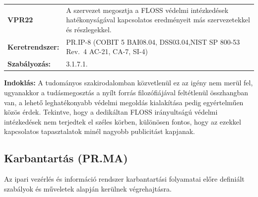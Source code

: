 \documentclass[12pt,magyar,a4paper,oneside]{scrreprt}
\begin{document}
\begin{longtable}[]{@{}ll@{}}
\toprule
\endhead
\begin{minipage}[t]{0.16\columnwidth}\raggedright
\textbf{VPR22}\strut
\end{minipage} & \begin{minipage}[t]{0.79\columnwidth}\raggedright
A szervezet megosztja a FLOSS védelmi intézkedések hatékonyságával
kapcsolatos eredményeit más szervezetekkel és részlegekkel.\strut
\end{minipage}\tabularnewline
\begin{minipage}[t]{0.16\columnwidth}\raggedright
\textbf{Keretrendszer:}\strut
\end{minipage} & \begin{minipage}[t]{0.79\columnwidth}\raggedright
PR.IP-8 (COBIT 5 BAI08.04, DSS03.04,NIST SP 800-53 Rev.~4 AC-21, CA-7,
SI-4)\strut
\end{minipage}\tabularnewline
\begin{minipage}[t]{0.16\columnwidth}\raggedright
\textbf{Szabályozás:}\strut
\end{minipage} & \begin{minipage}[t]{0.79\columnwidth}\raggedright
3.1.7.1.\strut
\end{minipage}\tabularnewline
\bottomrule
\end{longtable}

\textbf{Indoklás: } A tudományos szakirodalomban közvetlenül ez az igény
nem merül fel, ugyanakkor a tudásmegosztás a nyílt forrás filozófiájával
feltétlenül összhangban van, a lehető leghatékonyabb védelmi megoldás
kialakítása pedig egyértelműen közös érdek. Tekintve, hogy a dedikáltan
FLOSS irányultságú védelmi intézkedések nem terjedtek el széles körben,
különösen fontos, hogy az ezekkel kapcsolatos tapasztalatok minél
nagyobb publicitást kapjanak.

\hypertarget{karbantartuxe1s-pr.ma}{%
\subsection{Karbantartás (PR.MA)}\label{karbantartuxe1s-pr.ma}}

Az ipari vezérlés és információ rendszer karbantartási folyamatai előre
definiált szabályok és műveletek alapján kerülnek végrehajtásra.
\end{document}
